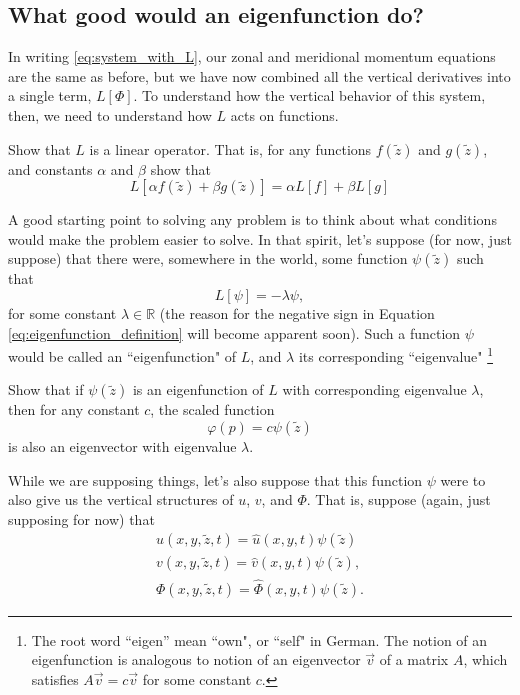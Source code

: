 \documentclass{article}
\numberwithin{equation}{section}
\newcommand{\z}{\tilde{z}}
\begin{document}
\subsection{What good would an eigenfunction do?}
In writing \eqref{eq:system_with_L}, our zonal and meridional momentum equations are the same as before, but we have now combined all the vertical derivatives into a single term, $L[\Phi]$. To understand how the vertical behavior of this system, then, we need to understand how $L$ acts on functions. 
%
\begin{exercise}
   \label{exercise:L_linear}
  Show that $L$ is a linear operator. That is, for any functions $f(\z)$ and $g(\z)$, and constants $\alpha$ and $\beta$ show that
\begin{equation}
  L[\alpha f(\z)+\beta g(\z)]=\alpha L[f] + \beta L[g]
\end{equation}
\end{exercise}
%
\par A good starting point to solving any problem is to think about what conditions would make the problem easier to solve. In that spirit, let's suppose (for now, just suppose) that there were, somewhere in the world, some function $\psi(\z)$ such that 
%
\begin{equation}
L[\psi] = -\lambda \psi,
\label{eq:eigenfunction_definition}
\end{equation}
%
for some constant $\lambda\in\mathbb{R}$ (the reason for the negative sign in Equation \ref{eq:eigenfunction_definition} will become apparent soon). Such a function $\psi$ would be called an ``eigenfunction" of $L$, and $\lambda$ its corresponding ``eigenvalue"
%
\footnote{The root word ``eigen'' mean ``own", or ``self" in German. The notion of an eigenfunction is analogous to notion of an eigenvector $\vec v$ of a matrix $A$, which satisfies $A\vec v = c\vec v$ for some constant $c$. }
%
\begin{exercise}
  \label{exercise:scaled_eigfn}
  Show that if $\psi(\z)$ is an eigenfunction of $L$ with corresponding eigenvalue $\lambda$, then for any constant $c$, the scaled function
  $$\varphi(p)=c\psi(\z)$$
  is also an eigenvector with eigenvalue $\lambda$.
\end{exercise}
%
While we are supposing things, let's also suppose that this function $\psi$ were to also give us the vertical structures of $u$, $v$, and $\Phi$. That is, suppose (again, just supposing for now) that
%
\begin{subequations}
  \label{eq:eigenstructures}
\begin{align}
  u(x,y,\z,t) = \hat u(x,y,t)\psi(\z)\\
  v(x,y,\z,t) = \hat v(x,y,t)\psi(\z), \\
  \Phi(x,y,\z,t) = \hat \Phi(x,y,t)\psi(\z).
\end{align}
\end{subequations}
\end{document}
